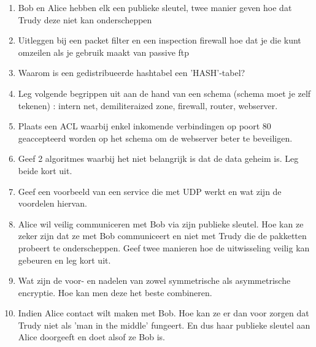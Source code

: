 \begin{enumerate}

\item Bob en Alice hebben elk een publieke sleutel, twee manier geven hoe dat Trudy deze niet kan onderscheppen


\item Uitleggen bij een packet filter en een inspection firewall hoe dat je die kunt omzeilen als je gebruik maakt van passive ftp


\item Waarom is een gedistribueerde hashtabel een 'HASH'-tabel?


\item Leg volgende begrippen uit aan de hand van een schema (schema moet je zelf tekenen) : intern net, demiliteraized zone, firewall, router, webserver.


\item Plaats een ACL waarbij enkel inkomende verbindingen op poort 80 geaccepteerd worden op het schema om de webserver beter te beveiligen.


\item Geef 2 algoritmes waarbij het niet belangrijk is dat de data geheim is. Leg beide kort uit.


\item Geef een voorbeeld van een service die met UDP werkt en wat zijn de voordelen hiervan.


\item Alice wil veilig communiceren met Bob via zijn publieke sleutel. Hoe kan ze zeker zijn dat ze met Bob communiceert en niet met Trudy die de pakketten probeert te onderscheppen. Geef twee manieren hoe de uitwisseling veilig kan gebeuren en leg kort uit.


\item Wat zijn de voor- en nadelen van zowel symmetrische als asymmetrische encryptie. Hoe kan men deze het beste combineren.


\item Indien Alice contact wilt maken met Bob. Hoe kan ze er dan voor zorgen dat Trudy niet als 'man in the middle' fungeert. En dus haar publieke sleutel aan Alice doorgeeft en doet alsof ze Bob is.


\end{enumerate}
